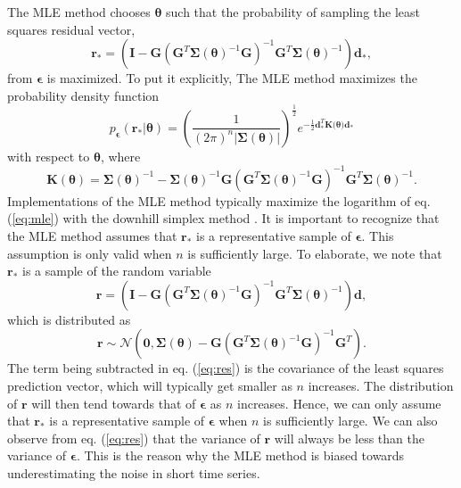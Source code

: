 \documentclass{svjour3}                     %
\begin{document}
The MLE method chooses $\mathbf{\theta}$ such that the probability of sampling the least squares residual vector,
\begin{equation}
  \mathbf{r}_* =  \left(\mathbf{I} - 
                  \mathbf{G}\left(\mathbf{G}^T\mathbf{\Sigma}(\mathbf{\theta})^{-1}
                  \mathbf{G}\right)^{-1}\mathbf{G}^T\mathbf{\Sigma}(\mathbf{\theta})^{-1}\right)
                  \mathbf{d_*},
\end{equation}  
from $\mathbf{\epsilon}$ is maximized. To put it explicitly, The MLE method maximizes the probability density function
\begin{equation}\label{eq:mle}
p_\mathbf{\epsilon}(\mathbf{r}_*|\mathbf{\theta}) = 
\left(\frac{1}{(2\pi)^n\left| \mathbf{\Sigma}(\mathbf{\theta}) \right|}\right)^{\frac{1}{2}} 
e^{-\tfrac{1}{2}\mathbf{d}_*^T\mathbf{K(\mathbf{\theta}})\mathbf{d}_*}
\end{equation}
with respect to $\mathbf{\theta}$, where
\begin{equation}
\mathbf{K}(\mathbf{\theta}) = \mathbf{\Sigma}(\mathbf{\theta})^{-1} - 
                              \mathbf{\Sigma}(\mathbf{\theta})^{-1}\mathbf{G}
                              \left(\mathbf{G}^T\mathbf{\Sigma}(\mathbf{\theta})^{-1}\mathbf{G}\right)^{-1}
                              \mathbf{G}^T\mathbf{\Sigma}(\mathbf{\theta})^{-1}.
\end{equation}
Implementations of the MLE method typically maximize the logarithm of eq. (\ref{eq:mle}) with the downhill simplex method \citep{Press2007}. It is important to recognize that the MLE method assumes that $\mathbf{r}_*$ is a representative sample of $\mathbf{\epsilon}$. This assumption is only valid when $n$ is sufficiently large. To elaborate, we note that $\mathbf{r_*}$ is a sample of the random variable
\begin{equation}
  \mathbf{r} =  \left(\mathbf{I} - 
                \mathbf{G}\left(\mathbf{G}^T\mathbf{\Sigma}(\mathbf{\theta})^{-1}\mathbf{G}\right)^{-1}
                \mathbf{G}^T\mathbf{\Sigma}(\mathbf{\theta})^{-1}\right)\mathbf{d},
\end{equation}  
which is distributed as
\begin{equation}\label{eq:res}
  \mathbf{r} \sim \mathcal{N}\left(\mathbf{0},
                  \mathbf{\Sigma}(\mathbf{\theta}) - 
                  \mathbf{G}\left(\mathbf{G}^T\mathbf{\Sigma}(\mathbf{\theta})^{-1}
                  \mathbf{G}\right)^{-1}\mathbf{G}^T\right).
\end{equation}
The term being subtracted in eq. (\ref{eq:res}) is the covariance of the least squares prediction vector, which will typically get smaller as $n$ increases. The distribution of $\mathbf{r}$ will then tend towards that of $\mathbf{\epsilon}$ as $n$ increases. Hence, we can only assume that $\mathbf{r}_*$ is a representative sample of $\mathbf{\epsilon}$ when $n$ is sufficiently large. We can also observe from eq. (\ref{eq:res}) that the variance of $\mathbf{r}$ will always be less than the variance of $\mathbf{\epsilon}$. This is the reason why the MLE method is biased towards underestimating the noise in short time series.
\end{document}
